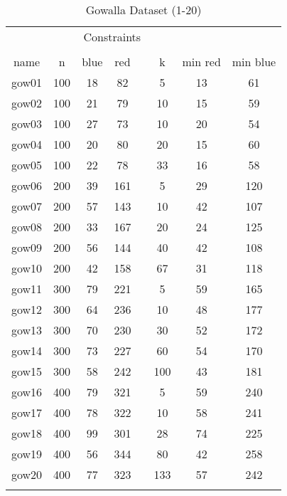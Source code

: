 \begin{table}[H]
    \centering
    \scriptsize
    \begin{tabular}{cccccccc}
        \firsthline
        \multicolumn{4}{c}{Graph Details} & & \multicolumn{3}{c}{Constraints}\\
        \cline{1-4} \cline{6-8}\\
         name &  n & blue & red & & k & min red & min blue\\
         \hline
        gow01 & 100 & 18 & 82 & & 5 & 13 & 61\\
        gow02 & 100 & 21 & 79 & & 10 & 15 & 59\\
        gow03 & 100 & 27 & 73 & & 10 & 20 & 54\\
        gow04 & 100 & 20 & 80 & & 20 & 15 & 60\\
        gow05 & 100 & 22 & 78 & & 33 & 16 & 58\\
        gow06 & 200 & 39 & 161 & & 5 & 29 & 120\\
        gow07 & 200 & 57 & 143 & & 10 & 42 & 107\\
        gow08 & 200 & 33 & 167 & & 20 & 24 & 125\\
        gow09 & 200 & 56 & 144 & & 40 & 42 & 108\\
        gow10 & 200 & 42 & 158 & & 67 & 31 & 118\\
        gow11 & 300 & 79 & 221 & & 5 & 59 & 165\\
        gow12 & 300 & 64 & 236 & & 10 & 48 & 177\\
        gow13 & 300 & 70 & 230 & & 30 & 52 & 172\\
        gow14 & 300 & 73 & 227 & & 60 & 54 & 170\\
        gow15 & 300 & 58 & 242 & & 100 & 43 & 181\\
        gow16 & 400 & 79 & 321 & & 5 & 59 & 240\\
        gow17 & 400 & 78 & 322 & & 10 & 58 & 241\\
        gow18 & 400 & 99 & 301 & & 28 & 74 & 225\\
        gow19 & 400 & 56 & 344 & & 80 & 42 & 258\\
        gow20 & 400 & 77 & 323 & & 133 & 57 & 242\\
        \lasthline
    \end{tabular}
    \caption{Gowalla Dataset (1-20)}
    \label{tab:gowalla_dataset_1}
    \normalsize
\end{table}
